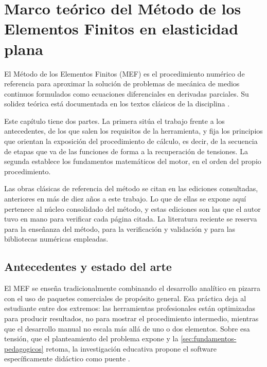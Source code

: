 \chapter{Marco teórico del Método de los Elementos Finitos en elasticidad plana}
\label{cap:marco_teorico}

El Método de los Elementos Finitos (MEF) es el procedimiento numérico de referencia para aproximar la solución de problemas de mecánica de medios continuos formulados como ecuaciones diferenciales en derivadas parciales. Su solidez teórica está documentada en los textos clásicos de la disciplina \autocite{zienkiewicz2013fem,bathe2014fem,cook2002concepts}.

Este capítulo tiene dos partes. La primera sitúa el trabajo frente a los antecedentes, de los que salen los requisitos de la herramienta, y fija los principios que orientan la exposición del procedimiento de cálculo, es decir, de la secuencia de etapas que va de las funciones de forma a la recuperación de tensiones. La segunda establece los fundamentos matemáticos del motor, en el orden del propio procedimiento.

Las obras clásicas de referencia del método se citan en las ediciones consultadas, anteriores en más de diez años a este trabajo. Lo que de ellas se expone aquí pertenece al núcleo consolidado del método, y estas ediciones son las que el autor tuvo en mano para verificar cada página citada. La literatura reciente se reserva para la enseñanza del método, para la verificación y validación y para las bibliotecas numéricas empleadas.

\section{Antecedentes y estado del arte}
\label{sec:antecedentes}

El MEF se enseña tradicionalmente combinando el desarrollo analítico en pizarra con el uso de paquetes comerciales de propósito general. Esa práctica deja al estudiante entre dos extremos: las herramientas profesionales están optimizadas para producir resultados, no para mostrar el procedimiento intermedio, mientras que el desarrollo manual no escala más allá de uno o dos elementos. Sobre esa tensión, que el planteamiento del problema expone y la \autoref{sec:fundamentos-pedagogicos} retoma, la investigación educativa propone el software específicamente didáctico como puente \autocite{bishay2020teaching,lee2015interactive,perezsantiago2023fem}.

